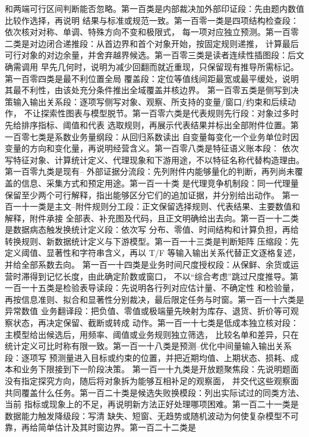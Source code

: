 和两端可行区间判断能否忽略。第一百类是内部裁决加外部印证段：先由题内数值比较作选择，再说明
结果与标准或规范一致。第一百零一类是四项结构检查段：依次核对对称、单调、特殊方向不变和极限式，
每一项对应独立预测。第一百零二类是对边闭合递推段：从首边界和首个对象开始，按固定规则递推，
计算最后可行对象的对边余量，并舍弃越界候选。第一百零三类是读者连续性插图段：后文确需调用
早先几何时，说明为减少回翻而就近重现，只保留现有推导所需标记。第一百零四类是最不利位置全局
覆盖段：定位等值线间距最宽或最平缓处，说明其最不利性，由该处充分条件推出全域覆盖并核边界。
第一百零五类是侧写到决策输入输出关系段：逐项写侧写对象、观察、所支持的变量/窗口/约束和后续动作，
不让探索性图表与模型脱节。第一百零六类是代表规则先行段：对象过多时先给排序指标、阈值和代表
选取规则，再展示代表结果并标出全部附件位置。第一百零七类是系数业务量纲段：从回归系数读出
自变量每变化一个业务单位时因变量的方向和变化量，再说明经营含义。第一百零八类是特征语义账本段：
依次写特征对象、计算统计定义、代理现象和下游用途，不以特征名称代替构造理由。第一百零九类是现有--
外部证据分流段：先列附件内能够量化的判断，再列尚未覆盖的信息、采集方式和预定用途。第一百一十类
是代理竞争机制段：同一代理量保留至少两个可行解释，指出能够区分它们的追加证据，并分别给出动作。
第一百一十一类是主文--附件规则分工段：正文保留选择规则、代表结果、主要数值和解释，附件承接
全部表、补充图及代码，且正文明确给出去向。第一百一十二类是数据病态触发换统计定义段：依次写
分布、零值、时间结构和计算负担，再给转换规则、新数据统计定义与下游模型。第一百一十三类是判断矩阵
压缩段：先定义阈值、显著性和字符串含义，再以 T/F 等输入输出关系代替正文逐格复述，并给全部系数去向。
第一百一十四类是业务时间尺度授权段：从保鲜、余货或运营时滞得到记忆长度，由此确定阶数或窗口，
不以“综合考虑”跳过尺度推导。第一百一十五类是检验表导读段：先说明各行列对应估计量、不确定性
和检验量，再按信息准则、拟合和显著性分别裁决，最后限定任务与时窗。第一百一十六类是异常数值
业务翻译段：把负值、零值或极端量先映射为库存、退货、折价等可观察状态，再决定保留、截断或转成
动作。第一百一十七类是低成本独立核对段：主模型给出候选后，用频率、阈值或业务规则独立筛选，
比较名单和差异，只在统计定义可比时称有限一致。第一百一十八类是预测--优化中间量输入输出关系段：逐项写
预测量进入目标或约束的位置，并把近期均值、上期状态、损耗、成本和业务下限接到下一阶段决策。
第一百一十九类是开放题聚焦段：先说明题面没有指定探究方向，随后将对象拆为能够互相补足的观察面，
并交代这些观察面共同覆盖什么任务。第一百二十类是候选失败换模段：列出实际试过的同类方法、当前
指标或现象上的不足，再说明新方法正好处理哪项困难。第一百二十一类是数据能力触发降级段：写清
缺失、短窗、无趋势或随机波动为何使复杂模型不可靠，再给简单估计及其时窗边界。第一百二十二类是
